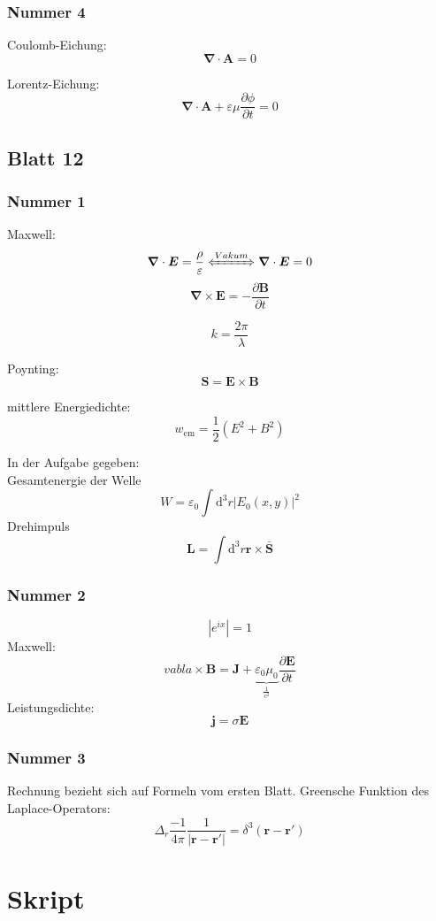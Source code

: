 \documentclass[titlepage,11pt,a4paper,ngerman]{report}
\newcommand{\dd}{\mathrm{d}}
\renewcommand{\vec}[1]{\bm{#1}}
\renewcommand{\epsilon}{\varepsilon}
\newcommand{\vabla}{\vec{\nabla}}
\newcommand{\vepsilon}{\varepsilon}
\begin{document}
\subsection{Nummer 4}

Coulomb-Eichung:
\[\vec{\nabla}\cdot\vec{A}=0\]

Lorentz-Eichung:
\[\vec{\nabla}\cdot\vec{A}+\vepsilon\mu\frac{\partial\phi}{\partial t}=0\]

\section{Blatt 12}

\subsection{Nummer 1}
Maxwell:
\[\vabla\cdot\vec{E}=\frac{\rho}{\epsilon}\xLeftrightarrow{Vakum}\vabla\cdot\vec{E}=0\]
\[\vabla\times\vec{E}=-\frac{\partial\vec{B}}{\partial t}\]

\[k=\frac{2\pi}{\lambda}\]

Poynting:
\[\vec{S}=\vec{E}\times\vec{B}\]

mittlere Energiedichte:
\[w_\mathrm{em}=\frac{1}{2}(E^2+B^2)\]

In der Aufgabe gegeben:\\
Gesamtenergie der Welle
\[W=\epsilon_0\int\dd^3r|E_0(x,y)|^2\]
Drehimpuls
\[\vec{L}=\int\dd^3r\vec{r}\times\bar{\vec{S}}\]

\subsection{Nummer 2}

\[|e^{ix}|=1\]
Maxwell:
\[vabla\times\vec{B}=\vec{J}+\underbrace{\epsilon_0\mu_0}_{\frac{1}{c^2}}\frac{\partial\vec{E}}{\partial t}\]
Leistungsdichte:
\[\vec{j}=\sigma\vec{E}\]

\subsection{Nummer 3}

Rechnung bezieht sich auf Formeln vom ersten Blatt.
Greensche Funktion des Laplace-Operators:
\[\Delta_r\frac{-1}{4\pi}\frac{1}{|\vec{r}-\vec{r}'|}=\delta^3(\vec{r}-\vec{r}')\]

\chapter{Skript}
\end{document}
